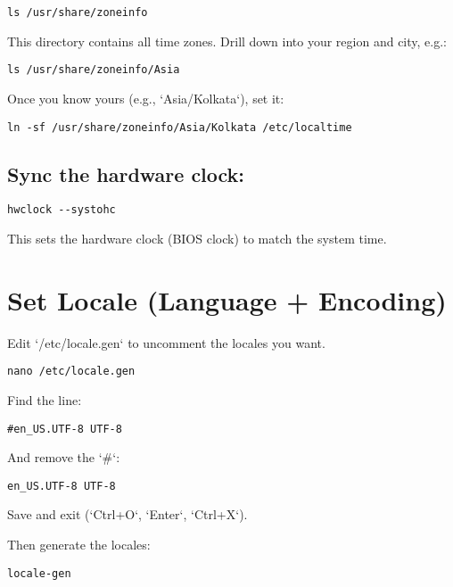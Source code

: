 \documentclass[12pt,openany]{book}
\begin{document}
\begin{lstlisting}
ls /usr/share/zoneinfo
\end{lstlisting}

This directory contains all time zones. Drill down into your region and city, e.g.:

\begin{lstlisting}
ls /usr/share/zoneinfo/Asia
\end{lstlisting}

Once you know yours (e.g., `Asia/Kolkata`), set it:

\begin{lstlisting}
ln -sf /usr/share/zoneinfo/Asia/Kolkata /etc/localtime
\end{lstlisting}

\subsection*{Sync the hardware clock:}

\begin{lstlisting}
hwclock --systohc
\end{lstlisting}

This sets the hardware clock (BIOS clock) to match the system time.

\section{Set Locale (Language + Encoding)}

Edit `/etc/locale.gen` to uncomment the locales you want.

\begin{lstlisting}
nano /etc/locale.gen
\end{lstlisting}

Find the line:

\begin{lstlisting}
#en_US.UTF-8 UTF-8
\end{lstlisting}

And remove the `#`:

\begin{lstlisting}
en_US.UTF-8 UTF-8
\end{lstlisting}

Save and exit (`Ctrl+O`, `Enter`, `Ctrl+X`).

Then generate the locales:

\begin{lstlisting}
locale-gen
\end{lstlisting}
\end{document}

